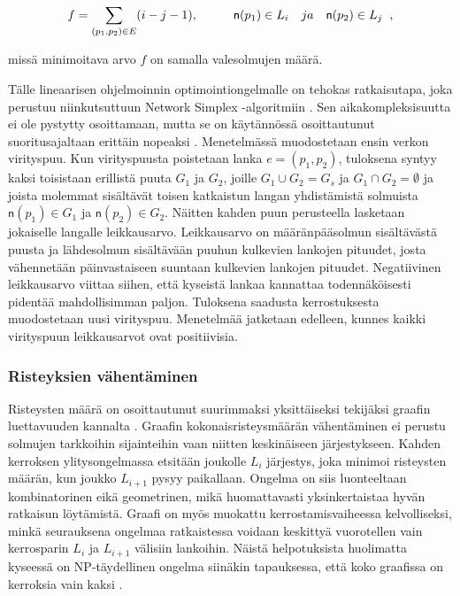\documentclass[finnish,12pt]{article}
\begin{document}
\begin{equation}
f=\displaystyle\sum\limits_{(p_1 ,p_2) \in E} (i - j - 1), \hspace{1cm}
\mathsf{n}(p_1) \in L_i \quad ja \quad \mathsf{n}(p_2) \in L_j \hspace{2mm},
\end{equation}

missä minimoitava arvo $f$ on samalla valesolmujen määrä.

Tälle lineaarisen ohjelmoinnin optimointiongelmalle on tehokas ratkaisutapa, joka perustuu niinkutsuttuun Network Simplex -algoritmiin \cite{RefWorks:71}.
Sen aikakompleksisuutta ei ole pystytty osoittamaan, mutta se on käytännössä osoittautunut suoritusajaltaan erittäin nopeaksi  \cite{RefWorks:28}.
Menetelmässä muodostetaan ensin verkon virityspuu.
Kun virityspuusta poistetaan lanka $e=(p_1, p_2)$, tuloksena syntyy kaksi toisistaan erillistä puuta $G_1$ ja $G_2$, joille $G_1 \cup G_2 = G_s$ ja $G_1 \cap G_2 = \emptyset$ ja joista molemmat sisältävät toisen katkaistun langan yhdistämistä solmuista $\mathsf{n}(p_1) \in G_1$ ja $\mathsf{n}(p_2) \in G_2$.
Näitten kahden puun perusteella lasketaan jokaiselle langalle leikkausarvo.
Leikkausarvo on määränpääsolmun sisältävästä puusta ja lähdesolmun sisältävään puuhun kulkevien lankojen pituudet,
josta vähennetään päinvastaiseen suuntaan kulkevien lankojen pituudet.
Negatiivinen leikkausarvo viittaa siihen, että kyseistä lankaa kannattaa todennäköisesti pidentää mahdollisimman paljon.
Tuloksena saadusta kerrostuksesta muodostetaan uusi virityspuu. Menetelmää jatketaan edelleen, kunnes kaikki virityspuun leikkausarvot ovat positiivisia.


		\subsubsection{Risteyksien vähentäminen}

Risteysten määrä on osoittautunut suurimmaksi yksittäiseksi tekijäksi graafin luettavuuden kannalta \cite{RefWorks:47}. 
Graafin kokonaisristeysmäärän vähentäminen ei perustu solmujen tarkkoihin sijainteihin vaan niitten keskinäiseen järjestykseen.
Kahden kerroksen ylitysongelmassa etsitään joukolle $L_i$ järjestys, joka minimoi risteysten määrän, kun joukko $L_{i+1}$ pysyy paikallaan.
Ongelma on siis luonteeltaan kombinatorinen eikä geometrinen, mikä huomattavasti yksinkertaistaa hyvän ratkaisun löytämistä.
Graafi on myös muokattu kerrostamisvaiheessa kelvolliseksi, minkä seurauksena ongelmaa ratkaistessa voidaan keskittyä vuorotellen vain kerrosparin $L_i$ ja $L_{i+1}$ välisiin lankoihin.
Näistä helpotuksista huolimatta kyseessä on NP-täydellinen ongelma siinäkin tapauksessa, että koko graafissa on kerroksia vain kaksi \cite{RefWorks:40}.
\end{document}
